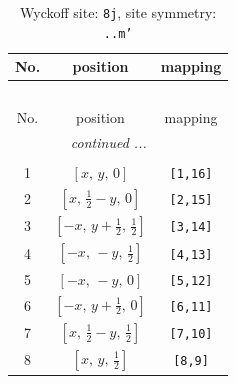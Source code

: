 \documentclass[fleqn,8pt]{jsarticle}
\begin{document}
\begin{longtable}{ccc}
\caption{Wyckoff site: {\tt 8j}, site symmetry: {\tt ..m'}}
 \\
 \hline \hline
No. & position & mapping \\ \hline \endfirsthead

\multicolumn{2}{l}{\tablename\ \thetable{}} \\
 \hline \hline
No. & position & mapping \\ \hline \endhead

 \hline \hline
\multicolumn{2}{r}{\footnotesize\it continued ...} \\ \endfoot

 \hline \hline
\multicolumn{2}{r}{} \\ \endlastfoot

1 & $\left[ x,\, y,\, 0 \right]$ & {\tt [1,16]} \\ \hline
2 & $\left[ x,\, \frac{1}{2} - y,\, 0 \right]$ & {\tt [2,15]} \\ \hline
3 & $\left[ - x,\, y + \frac{1}{2},\, \frac{1}{2} \right]$ & {\tt [3,14]} \\ \hline
4 & $\left[ - x,\, - y,\, \frac{1}{2} \right]$ & {\tt [4,13]} \\ \hline
5 & $\left[ - x,\, - y,\, 0 \right]$ & {\tt [5,12]} \\ \hline
6 & $\left[ - x,\, y + \frac{1}{2},\, 0 \right]$ & {\tt [6,11]} \\ \hline
7 & $\left[ x,\, \frac{1}{2} - y,\, \frac{1}{2} \right]$ & {\tt [7,10]} \\ \hline
8 & $\left[ x,\, y,\, \frac{1}{2} \right]$ & {\tt [8,9]} \\
\end{longtable}
\renewcommand{\arraystretch}{1.2}
\end{document}
